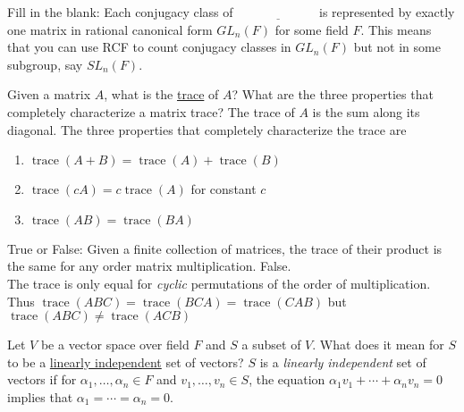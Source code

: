 \documentclass[avery5371,grid]{flashcards}
\newcommand{\blank}{$\; \underline{\hspace{1in}} \; $}
\DeclareMathOperator{\tr}{trace}
\begin{document}
\begin{flashcard}{Fill in the blank: Each conjugacy class of \blank is represented by exactly one matrix in rational canonical form}
 $GL_n(F)$ for some field $F$. This means that you can use RCF to count conjugacy classes in $GL_n(F)$ but not in some subgroup, say $SL_n(F).$
\end{flashcard}

\begin{flashcard}{Given a matrix $A$, what is the \underline{trace} of $A$? What are the three properties that completely characterize a matrix trace?}
 The trace of $A$ is the sum along its diagonal. The three properties that completely characterize the trace are
 \begin{enumerate}
      \item $\tr(A+B) = \tr(A) + \tr(B)$
      \item $\tr(cA) = c\tr(A)$ for constant $c$
      \item $\tr(AB) = \tr(BA)$
 \end{enumerate}

\end{flashcard}

\begin{flashcard}{True or False: Given a finite collection of matrices, the trace of their product is the same for any order matrix multiplication.}
 False.\\
 
 The trace is only equal for \emph{cyclic} permutations of the order of multiplication. Thus $\tr(ABC) = \tr(BCA) = \tr(CAB)$ but $\tr(ABC) \neq \tr(ACB)$
\end{flashcard}

\begin{flashcard}{Let $V$ be a vector space over field $F$ and $S$ a subset of $V$. What does it mean for $S$ to be a \underline{linearly independent} set of vectors?}
 $S$ is a \emph{linearly independent} set of vectors if for $\alpha_1, \ldots, \alpha_n \in F$ and $v_1, \ldots, v_n \in S$, the equation $\alpha_1 v_1 + \cdots + \alpha_n v_n = 0$ implies that $\alpha_1 = \cdots = \alpha_n = 0$.
\end{flashcard}
\end{document}
